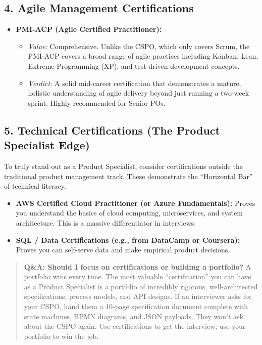 \subsection{4. Agile Management
Certifications}\label{agile-management-certifications}

\begin{itemize}
\tightlist
\item
  \textbf{PMI-ACP (Agile Certified Practitioner):}

  \begin{itemize}
  \tightlist
  \item
    \emph{Value:} Comprehensive. Unlike the CSPO, which only covers
    Scrum, the PMI-ACP covers a broad range of agile practices including
    Kanban, Lean, Extreme Programming (XP), and test-driven development
    concepts.
  \item
    \emph{Verdict:} A solid mid-career certification that demonstrates a
    mature, holistic understanding of agile delivery beyond just running
    a two-week sprint. Highly recommended for Senior POs.
  \end{itemize}
\end{itemize}

\subsection{5. Technical Certifications (The Product Specialist
Edge)}\label{technical-certifications-the-product-specialist-edge}

To truly stand out as a Product Specialist, consider certifications
outside the traditional product management track. These demonstrate the
``Horizontal Bar'' of technical literacy.

\begin{itemize}
\tightlist
\item
  \textbf{AWS Certified Cloud Practitioner (or Azure Fundamentals):}
  Proves you understand the basics of cloud computing, microservices,
  and system architecture. This is a massive differentiator in
  interviews.
\item
  \textbf{SQL / Data Certifications (e.g., from DataCamp or Coursera):}
  Proves you can self-serve data and make empirical product decisions.
\end{itemize}

\begin{quote}
\textbf{Q\&A: Should I focus on certifications or building a portfolio?}
A portfolio wins every time. The most valuable ``certification'' you can
have as a Product Specialist is a portfolio of incredibly rigorous,
well-architected specifications, process models, and API designs. If an
interviewer asks for your CSPO, hand them a 10-page specification
document complete with state machines, BPMN diagrams, and JSON payloads.
They won't ask about the CSPO again. Use certifications to get the
interview; use your portfolio to win the job.
\end{quote}

